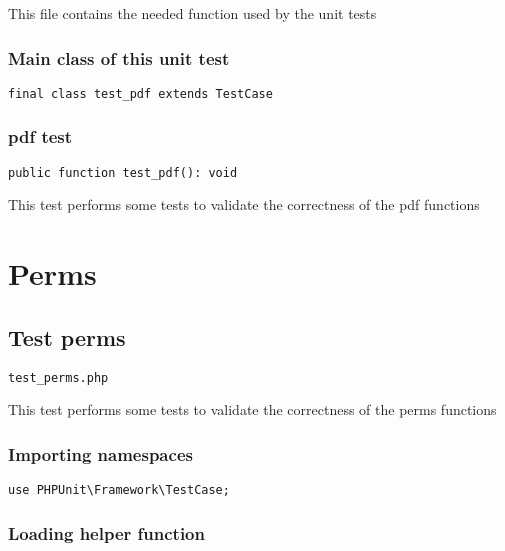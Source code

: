 \documentclass[a4paper]{article}
\begin{document}
This file contains the needed function used by the unit tests

\hypertarget{toc324}{}
\subsubsection{Main class of this unit test}

\begin{lstlisting}
final class test_pdf extends TestCase
\end{lstlisting}

\hypertarget{toc325}{}
\subsubsection{pdf test}

\begin{lstlisting}
public function test_pdf(): void
\end{lstlisting}

This test performs some tests to validate the correctness
of the pdf functions


\hypertarget{toc326}{}
\section{Perms}

\hypertarget{toc327}{}
\subsection{Test perms}

\begin{lstlisting}
test_perms.php
\end{lstlisting}

This test performs some tests to validate the correctness
of the perms functions

\hypertarget{toc328}{}
\subsubsection{Importing namespaces}

\begin{lstlisting}
use PHPUnit\Framework\TestCase;
\end{lstlisting}

\hypertarget{toc329}{}
\subsubsection{Loading helper function}
\end{document}
